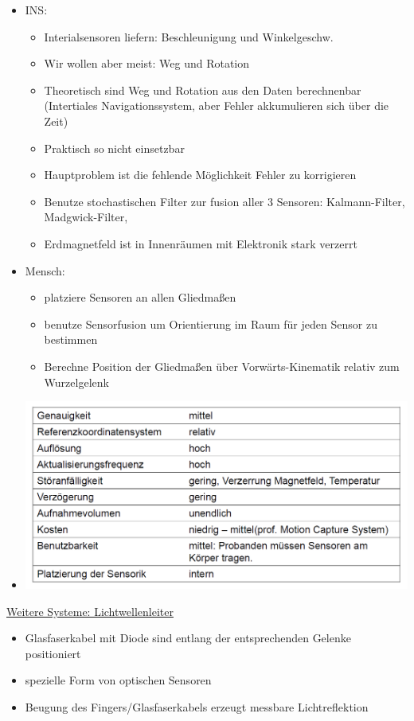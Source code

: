 \documentclass[a4paper,10pt,oneside]{article}
\begin{document}
\begin{itemize}
		\item INS:
			\begin{itemize}
				\item Interialsensoren liefern: Beschleunigung und Winkelgeschw.
				\item Wir wollen aber meist: Weg und Rotation
				\item Theoretisch sind Weg und Rotation aus den Daten berechnenbar (Intertiales Navigationssystem, aber Fehler akkumulieren sich über die Zeit)
				\item Praktisch so nicht einsetzbar
				\item Hauptproblem ist die fehlende Möglichkeit Fehler zu korrigieren
				\item Benutze stochastischen Filter zur fusion aller 3 Sensoren: Kalmann-Filter, Madgwick-Filter, 
				\item Erdmagnetfeld ist in Innenräumen mit Elektronik stark verzerrt
			\end{itemize}
		\item Mensch:
			\begin{itemize}
				\item platziere Sensoren an allen Gliedmaßen
				\item benutze Sensorfusion um Orientierung im Raum für jeden Sensor zu bestimmen
				\item Berechne Position der Gliedmaßen über Vorwärts-Kinematik relativ zum Wurzelgelenk
			\end{itemize}
		\item[] \includegraphics[scale=0.2]{Grafiken/2246.png}
	\end{itemize}

\underline{Weitere Systeme: Lichtwellenleiter} \\
	\begin{itemize}
		\item Glasfaserkabel mit Diode sind entlang der entsprechenden Gelenke positioniert
		\item spezielle Form von optischen Sensoren
		\item Beugung des Fingers/Glasfaserkabels erzeugt messbare Lichtreflektion
	\end{itemize}
\end{document}
